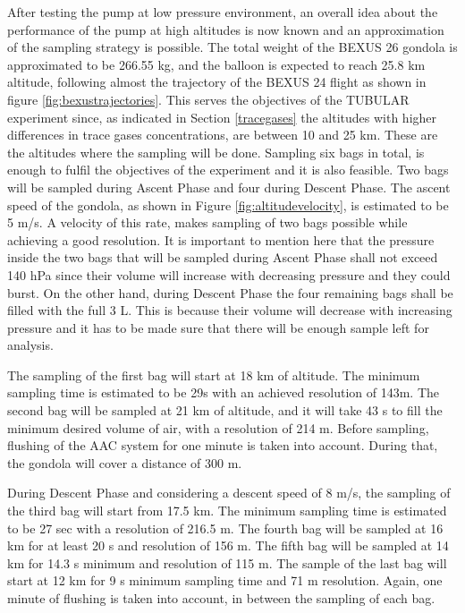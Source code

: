 After testing the pump at low pressure environment, an overall idea about the performance of the pump at high altitudes is now known and an approximation of the sampling strategy is possible.   
The total weight of the BEXUS 26 gondola is approximated to be 266.55 kg, and the balloon is expected to reach 25.8 km altitude, following almost the trajectory of the BEXUS 24 flight as shown in figure \ref{fig:bexustrajectories}. 
This serves the objectives of the TUBULAR experiment since, as indicated in Section \ref{tracegases} the altitudes with higher differences in trace gases concentrations, are between 10 and 25 km. These are the altitudes where the sampling will be done. Sampling six bags in total, is enough to fulfil the objectives of the experiment and it is also feasible. Two bags will be sampled during Ascent Phase and four during Descent Phase. The ascent speed of the gondola, as shown in Figure \ref{fig:altitudevelocity}, is estimated to be 5 m/s. A velocity of this rate, makes sampling of two bags possible while achieving a good resolution. It is important to mention here that the pressure inside the two bags that will be sampled during Ascent Phase shall not exceed 140 hPa since their volume will increase with decreasing pressure and they could burst. On the other hand, during Descent Phase the four remaining bags shall be filled with the full 3 L. This is because their volume will decrease with increasing pressure and it has to be made sure that there will be enough sample left for analysis. 

The sampling of the first bag will start at 18 km of altitude. The minimum sampling time is estimated to be 29s with an achieved resolution of 143m. The second bag will be sampled at 21 km of altitude, and it will take 43 s to fill the minimum desired volume of air, with a resolution of 214 m. Before sampling, flushing of the AAC system for one minute is taken into account. During that, the gondola will cover a distance of 300 m. 

During Descent Phase and considering a descent speed of 8 m/s, the sampling of the third bag will start from 17.5 km. The minimum sampling time is estimated to be 27 sec with a resolution of 216.5 m. The fourth bag will be sampled at 16 km for at least 20 s and resolution of 156 m. The fifth bag will be sampled at 14 km for 14.3 s minimum and resolution of 115 m. The sample of the last bag will start at 12 km for 9 s minimum sampling time and 71 m resolution. Again, one minute of flushing is taken into account, in between the sampling of each bag.

